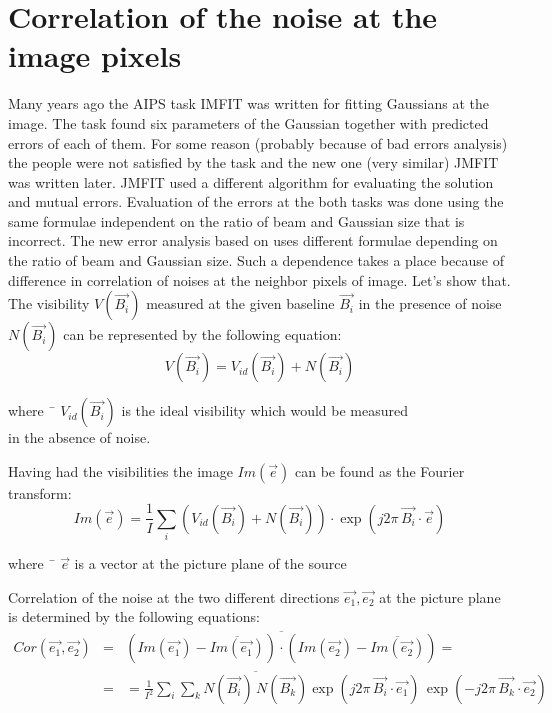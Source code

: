 \section{Correlation of the noise at the image pixels}
Many years ago the AIPS task IMFIT was written for fitting Gaussians at the image. The task found six parameters of the Gaussian together with predicted errors of each of them. For some reason (probably because of bad errors analysis) the people were not satisfied  by the task and the new one (very similar) JMFIT was written later. JMFIT used a different algorithm for evaluating the solution and mutual errors. Evaluation of the errors at the both tasks was done using the same formulae independent on the ratio of beam and Gaussian size that is incorrect. The new error analysis based on \cite{kog} uses different formulae depending on the ratio of beam and Gaussian size. Such a dependence takes a place because of difference in correlation of noises at the neighbor  pixels of image. Let's show that.
The visibility $V(\vec{B_i})$ measured at the given baseline $\vec{B_i}$ in the presence of noise $N(\vec{B_i})$ can be represented by the following equation:
\begin{equation}
V(\vec{B_i}) = V_{id}(\vec{B_i}) + N(\vec{B_i})
\label{eq:v(uv)}
\end{equation}
\begin{tabbing}
where~
\= $V_{id}(\vec{B_i})$ is the ideal visibility which would be measured \\
\> in the absence of noise.\\
\end{tabbing}
Having had the visibilities the image $Im(\vec{e})$ can be found as the Fourier transform:
\begin{equation}
Im(\vec{e}) = \frac{1}{I} \sum_{i} (V_{id}(\vec{B_i}) + N(\vec{B_i})) \cdot
\exp(j 2 \pi \, \vec{B_i}\cdot \vec{e})
\label{eq:im}
\end{equation}
\begin{tabbing}
where~
\= $\vec{e}$ is a vector at the picture plane of the source \\
\end{tabbing}
Correlation of the noise at the two different directions
 $\vec{e_1}, \vec{e_2}$
  at the picture plane is determined by the following equations:
\begin{eqnarray}
Cor(\vec{e_1}, \vec{e_2}) & = &
\overline{( Im(\vec{e_1}) - \overline{Im(\vec{e_1})} ) \cdot
    ( Im(\vec{e_2}) - \overline{Im(\vec{e_2})} ) } = \nonumber\\
& = &
= \frac{1}{I^2} \sum_i \sum_k \overline{N(\vec{B_i}) \, N(\vec{B_k})}
\exp(j 2 \pi \, \vec{B_i}\cdot \vec{e_1} ) \,
\exp(-j 2 \pi \, \vec{B_k}\cdot \vec{e_2})
\label{eq:cor1}
\end{eqnarray}
